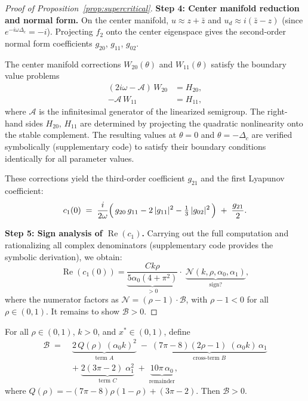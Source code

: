 \begin{proof}[Proof of Proposition~\ref{prop:supercritical}]
\medskip
\noindent\textbf{Step 4: Center manifold reduction and normal form.}
On the center manifold, $u\approx z+\bar{z}$ and $u_d\approx i(\bar{z}-z)$ (since $e^{-i\omega\Delta_c}=-i$). Projecting $f_2$ onto the center eigenspace gives the second-order normal form coefficients $g_{20}$, $g_{11}$, $g_{02}$.

The center manifold corrections $W_{20}(\theta)$ and $W_{11}(\theta)$ satisfy the boundary value problems
\begin{align*}
(2i\omega - \mathcal{A})\,W_{20} &= H_{20}, \\
-\mathcal{A}\,W_{11} &= H_{11},
\end{align*}
where $\mathcal{A}$ is the infinitesimal generator of the linearized semigroup. The right-hand sides $H_{20}$, $H_{11}$ are determined by projecting the quadratic nonlinearity onto the stable complement. The resulting values at $\theta=0$ and $\theta=-\Delta_c$ are verified symbolically (supplementary code) to satisfy their boundary conditions identically for all parameter values.

These corrections yield the third-order coefficient $g_{21}$ and the first Lyapunov coefficient:
\begin{equation}
c_1(0) \;=\; \frac{i}{2\omega}
  \Bigl(\,g_{20}\,g_{11} - 2\,|g_{11}|^2 - \tfrac{1}{3}\,|g_{02}|^2\,\Bigr)
  \;+\; \frac{g_{21}}{2}.
\label{eq:c1_appendix}
\end{equation}

\medskip
\noindent\textbf{Step 5: Sign analysis of $\operatorname{Re}(c_1)$.}
Carrying out the full computation and rationalizing all complex denominators (supplementary code provides the symbolic derivation), we obtain:
\begin{equation}
\operatorname{Re}(c_1(0))=\underbrace{\frac{Ck\rho}{5\alpha_0(4+\pi^2)}}_{>0}\cdot\;\underbrace{\mathcal{N}(k,\rho,\alpha_0,\alpha_1)}_{\text{sign?}},
\label{eq:Re_c1_closed_app}
\end{equation}
where the numerator factors as $\mathcal{N}=(\rho-1)\cdot\mathcal{B}$, with $\rho-1<0$ for all $\rho\in(0,1)$. It remains to show $\mathcal{B}>0$.
\end{proof}

\begin{lemma}
\label{lem:B_positive}
For all $\rho\in(0,1)$, $k>0$, and $x^*\in(0,1)$, define
\begin{align*}
\mathcal{B} \;=\;&
  \underbrace{2\,Q(\rho)\;(\alpha_0 k)^2}_{\text{term } A}
  \;-\; \underbrace{(7\pi{-}8)(2\rho{-}1)\;(\alpha_0 k)\,\alpha_1}_{\text{cross-term } B}  \\[4pt]
  &+\; \underbrace{2(3\pi{-}2)\;\alpha_1^2}_{\text{term } C}
  \;+\; \underbrace{10\pi\,\alpha_0}_{\text{remainder}},
\end{align*}
where $Q(\rho)=-(7\pi-8)\rho(1-\rho)+(3\pi-2)$. Then $\mathcal{B}>0$.
\end{lemma}

